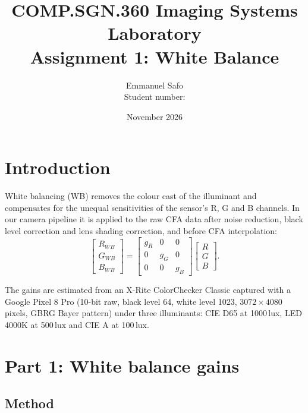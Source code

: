 \documentclass[11pt,a4paper]{article}
\title{COMP.SGN.360 Imaging Systems Laboratory\\[4pt]
       \large Assignment 1: White Balance}
\author{Emmanuel Safo\\ Student number: \rule{3cm}{0.4pt}}
\date{November 2026}
\begin{document}
\maketitle

\section{Introduction}

White balancing (WB) removes the colour cast of the illuminant and compensates
for the unequal sensitivities of the sensor's R, G and B channels. In our camera
pipeline it is applied to the raw CFA data after noise reduction, black level
correction and lens shading correction, and before CFA interpolation:
\begin{equation}
\begin{bmatrix} R_{WB} \\ G_{WB} \\ B_{WB} \end{bmatrix} =
\begin{bmatrix} g_R & 0 & 0 \\ 0 & g_G & 0 \\ 0 & 0 & g_B \end{bmatrix}
\begin{bmatrix} R \\ G \\ B \end{bmatrix}.
\end{equation}

The gains are estimated from an X-Rite ColorChecker Classic captured with a
Google Pixel 8 Pro (10-bit raw, black level 64, white level 1023,
$3072 \times 4080$ pixels, GBRG Bayer pattern) under three illuminants:
CIE D65 at 1000\,lux, LED 4000K at 500\,lux and CIE A at 100\,lux.

\section{Part 1: White balance gains}

\subsection{Method}
\end{document}
